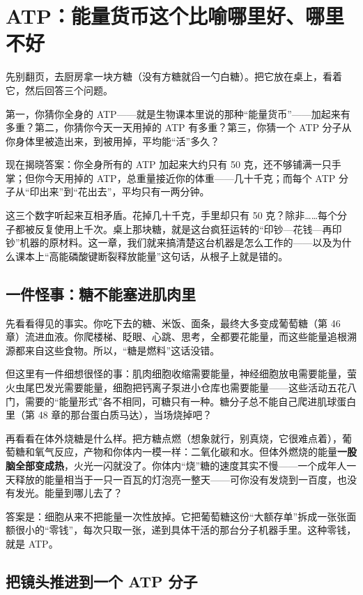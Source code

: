 \chapter{ATP：能量货币这个比喻哪里好、哪里不好}

\begin{kaichang}
先别翻页，去厨房拿一块方糖（没有方糖就舀一勺白糖）。把它放在桌上，看着它，然后回答三个问题。

第一，你猜你全身的 ATP——就是生物课本里说的那种“能量货币”——加起来有多重？第二，你猜你今天一天用掉的 ATP 有多重？第三，你猜一个 ATP 分子从你身体里被造出来，到被用掉，平均能“活”多久？

现在揭晓答案：你全身所有的 ATP 加起来大约只有 50 克，还不够铺满一只手掌；但你今天用掉的 ATP，总重量接近你的体重——几十千克；而每个 ATP 分子从“印出来”到“花出去”，平均只有一两分钟。

这三个数字听起来互相矛盾。花掉几十千克，手里却只有 50 克？除非……每个分子都被反复使用上千次。桌上那块糖，就是这台疯狂运转的“印钞—花钱—再印钞”机器的原材料。这一章，我们就来搞清楚这台机器是怎么工作的——以及为什么课本上“高能磷酸键断裂释放能量”这句话，从根子上就是错的。
\end{kaichang}

\section{一件怪事：糖不能塞进肌肉里}

先看看得见的事实。你吃下去的糖、米饭、面条，最终大多变成葡萄糖（第 46 章）流进血液。你爬楼梯、眨眼、心跳、思考，全都要花能量，而这些能量追根溯源都来自这些食物。所以，“糖是燃料”这话没错。

但这里有一件细想很怪的事：肌肉细胞收缩需要能量，神经细胞放电需要能量，萤火虫尾巴发光需要能量，细胞把钙离子泵进小仓库也需要能量——这些活动五花八门，需要的“能量形式”各不相同，可糖只有一种。糖分子总不能自己爬进肌球蛋白里（第 48 章的那台蛋白质马达），当场烧掉吧？

再看看在体外烧糖是什么样。把方糖点燃（想象就行，别真烧，它很难点着），葡萄糖和氧气反应，产物和你体内一模一样：二氧化碳和水。但体外燃烧的能量\textbf{一股脑全部变成热}，火光一闪就没了。你体内“烧”糖的速度其实不慢——一个成年人一天释放的能量相当于一只一百瓦的灯泡亮一整天——可你没有发烧到一百度，也没有发光。能量到哪儿去了？

答案是：细胞从来不把能量一次性放掉。它把葡萄糖这份“大额存单”拆成一张张面额很小的“零钱”，每次只取一张，递到具体干活的那台分子机器手里。这种零钱，就是 ATP。

\section{把镜头推进到一个 ATP 分子}


